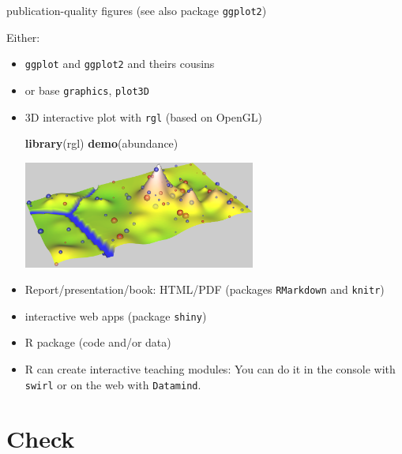\documentclass[9pt,ignorenonframetext,]{beamer}
\newenvironment{Shaded}{\begin{snugshade}}{\end{snugshade}}
\newcommand{\KeywordTok}[1]{\textcolor[rgb]{0.13,0.29,0.53}{\textbf{{#1}}}}
\newcommand{\NormalTok}[1]{{#1}}
\begin{document}
\begin{frame}[fragile]{publication-quality figures (see also package
\texttt{ggplot2})}

Either:

\begin{itemize}
\item
  \texttt{ggplot} and \texttt{ggplot2} and theirs cousins
\item
  or base \texttt{graphics}, \texttt{plot3D}
\item
  3D interactive plot with \texttt{rgl} (based on OpenGL)

\begin{Shaded}
\begin{Highlighting}[]
\KeywordTok{library}\NormalTok{(rgl)}
\KeywordTok{demo}\NormalTok{(abundance) }
\end{Highlighting}
\end{Shaded}

  \includegraphics[width=0.60000\textwidth]{imgPres/rgl_demo.png}
\item
  Report/presentation/book: HTML/PDF (packages \texttt{RMarkdown} and
  \texttt{knitr})
\item
  interactive web apps (package \texttt{shiny})
\item
  R package (code and/or data)
\item
  R can create interactive teaching modules: You can do it in the
  console with \texttt{swirl} or on the web with \texttt{Datamind}.
\end{itemize}

\end{frame}

\section{Check}\label{check}
\end{document}

